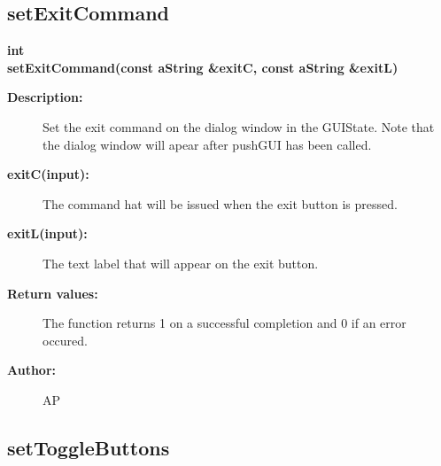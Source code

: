 \subsection{setExitCommand}
 
\newlength{\DialogDataIncludeArgIndent}
\begin{flushleft} \textbf{%
int  \\ 
\settowidth{\DialogDataIncludeArgIndent}{setExitCommand(}%
setExitCommand(const aString \&exitC, const aString \&exitL)
}\end{flushleft}
\begin{description}
\item[{\bf Description:}]  Set the exit command on the dialog window in the GUIState. Note that
  the dialog window will apear after pushGUI has been called.

\item[{\bf exitC(input):}]  The command hat will be issued when the exit button is pressed.
\item[{\bf exitL(input):}]  The text label that will appear on the exit button.

\item[{\bf Return values:}]  The function returns 1 on a successful completion and 0 if an error occured.
\item[{\bf Author:}]  AP
\end{description}
\subsection{setToggleButtons}
 
